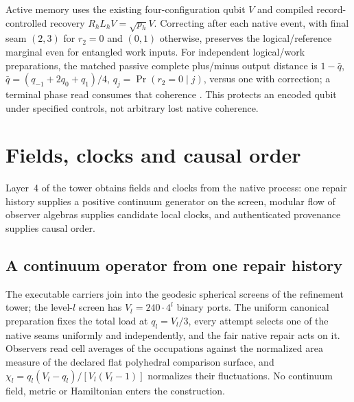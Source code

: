 \documentclass[11pt]{article}
\theoremstyle{definition}
\theoremstyle{remark}
\begin{document}
Active memory uses the existing four-configuration qubit $V$ and compiled
record-controlled recovery $R_hL_hV=\sqrt{p_h}V$. Correcting after each
native event, with final seam $(2,3)$ for $r_2=0$ and $(0,1)$ otherwise,
preserves the logical/reference marginal even for entangled work inputs.
For independent logical/work preparations, the matched passive complete
plus/minus output distance is $1-\bar q$,
$\bar q=(q_{-1}+2q_0+q_1)/4$, $q_j=\Pr(r_2=0\mid j)$, versus one with correction; a terminal phase
read consumes that coherence \cite{ophencodedmemory}. This protects an
encoded qubit under specified controls, not arbitrary lost native coherence.

\section{Fields, clocks and causal order}
\label{sec:fields}

Layer~4 of the tower obtains fields and clocks from the native process: one
repair history supplies a positive continuum generator on the screen,
modular flow of observer algebras supplies candidate local clocks, and
authenticated provenance supplies causal order.

\subsection{A continuum operator from one repair history}
\label{sec:continuum}

The executable carriers join into the geodesic spherical screens of the
refinement tower; the level-$l$ screen has $V_l=240\cdot4^l$ binary ports.
The uniform canonical preparation fixes the total load at $q_l=V_l/3$, every
attempt selects one of the native seams uniformly and independently, and the
fair native repair acts on it. Observers read cell averages of the
occupations against the normalized area measure of the declared flat
polyhedral comparison surface, and
$\chi_l=q_l(V_l-q_l)/[V_l(V_l-1)]$ normalizes their fluctuations. No
continuum field, metric or Hamiltonian enters the construction.
\end{document}

